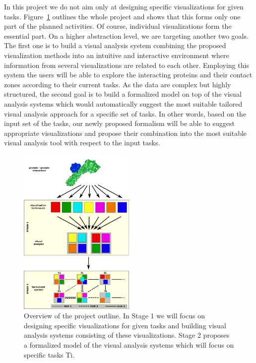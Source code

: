 \documentclass[11pt,a4paper,titlepage,oneside,onecolumn]{article}
\begin{document}
In this project we do not aim only at designing specific visualizations for given tasks.
Figure~\ref{fig:system} outlines the whole project and shows that this forms only one part of the planned activities.  
Of course, individual visualizations form the essential part.
On a higher abstraction level, we are targeting another two goals.
The first one is to build a visual analysis system combining the proposed visualization methods into an intuitive and interactive environment where information from several visualizations are related to each other.
Employing this system the users will be able to explore the interacting proteins and their contact zones according to their current tasks.
As the data are complex but highly structured, the second goal is to build a formalized model on top of the visual analysis systems which would automatically suggest the most suitable tailored visual analysis approach for a specific set of tasks.
In other words, based on the input set of the tasks, our newly proposed formalism will be able to suggest appropriate visualizations and propose their combination into the most suitable visual analysis tool with respect to the input tasks.


\begin{figure}[htb]
\centering
\includegraphics[width=0.5\textwidth]{pics/system.png}
\caption{Overview of the project outline. In Stage 1 we will focus on designing specific visualizations for given tasks and building visual analysis systems consisting of these visualizations. Stage 2 proposes a formalized model of the visual analysis systems which will focus on specific tasks Ti.}
\label{fig:system}
\end{figure}
\end{document}
